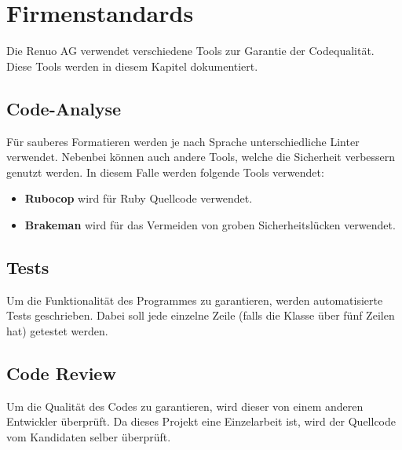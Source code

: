 \chapter{Firmenstandards}
Die Renuo AG verwendet verschiedene Tools zur Garantie der Codequalität. Diese Tools werden in diesem Kapitel dokumentiert.

\section{Code-Analyse}
Für sauberes Formatieren werden je nach Sprache unterschiedliche \gls{Linter} verwendet. Nebenbei können auch andere Tools, welche die Sicherheit verbessern genutzt werden. In diesem Falle werden folgende Tools verwendet:

\begin{itemize}
    \item \textbf{Rubocop} wird für Ruby Quellcode verwendet.
    \item \textbf{Brakeman} wird für das Vermeiden von groben Sicherheitslücken verwendet.
\end{itemize}

\section{Tests}
Um die Funktionalität des Programmes zu garantieren, werden automatisierte Tests geschrieben. Dabei soll jede einzelne Zeile (falls die Klasse über fünf Zeilen hat) getestet werden.

\section{Code Review}
Um die Qualität des Codes zu garantieren, wird dieser von einem anderen Entwickler überprüft. Da dieses Projekt eine Einzelarbeit ist, wird der Quellcode vom Kandidaten selber überprüft.
